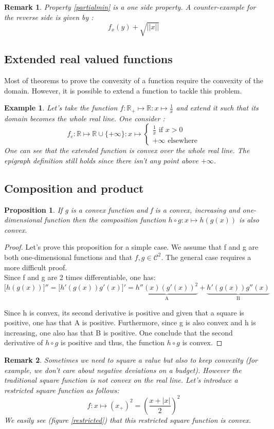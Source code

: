 \documentclass[12pt,a4paper]{article}
\newtheorem{prop}{Proposition}
\newtheorem{exmp}{Example}[section]
\newtheorem{remark}{Remark}
\begin{document}
 \begin{remark}
Property \ref{partialmin} is a one side property. A counter-example for the reverse side is given by :
$$f_x(y) + \sqrt{||x||}$$
\end{remark}

\subsection{Extended real valued functions}

Most of theorems to prove the convexity of a function require the convexity of the domain. However, it is possible to extend a function to tackle this problem. 

\begin{exmp}
Let's take the function $f : \mathbb{R}_+ \mapsto \mathbb{R} : x \mapsto \frac{1}{x}$ and extend it such that its domain becomes the whole real line. One consider : 
$$f_e : \mathbb{R} \mapsto \mathbb{R} \cup \{ + \infty \} : x \mapsto 
\begin{cases} \frac{1}{x} \text{ if } x > 0 \\
+ \infty \text{ elsewhere}
\end{cases}$$
One can see that the extended function is convex over the whole real line. The epigraph definition still holds since there isn't any point above $+\infty$.
\end{exmp}
    \subsection{Composition and product}
    \begin{prop}
If g is a convex function and f is a convex, increasing and one-dimensional function then the composition function $h \circ g : x \mapsto h(g(x))$ is also convex. 
\end{prop}
\begin{proof}
Let's prove this proposition for a simple case. We assume that f and g are both one-dimensional functions and that $f,g \in \mathcal{C}^2$. The general case requires a more difficult proof. \\
Since f and g are 2 times differentiable, one has:
$$\big[ h(g(x))\big]'' = \big[ h'(g(x))g'(x)\big]' = \underbrace{h''(x)(g'(x))^2}_\text{A} + \underbrace{h'(g(x))g''(x)}_\text{B} $$

Since h is convex, its second derivative is positive and given that a square is positive, one has that A is positive. Furthermore, since g is also convex and h is increasing, one also has that B is positive. One conclude that the second derivative of $h \circ g$ is positive and thus, the function $h \circ g$ is convex. 
\end{proof}
\begin{remark}
Sometimes we need to square a value but also to keep convexity (for example, we don't care about negative deviations on a budget). However the traditional square function is not convex on the real line. Let's introduce a restricted square function as follows: 
$$f : x \mapsto (x_+)^2 = (\frac{x + |x|}{2})^2$$
We easily see (figure \ref{restricted}) that this restricted square function is convex.
\end{remark}
\end{document}

